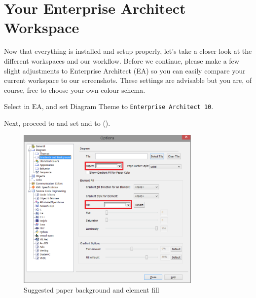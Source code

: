 \genHeader

\section{Your Enterprise Architect Workspace}

Now\hypertarget{projectStructure vis}{} that everything is installed and setup properly, let's take a closer look at the different workspaces and our workflow.
Before we continue, please make a few slight adjustments to Enterprise Architect (EA) so you can easily compare your current workspace to our screenshots.
These settings are advisable but you are, of course, free to choose your own colour schema.

\begin{stepbystep}

\item  Select  in EA, and set Diagram Theme to \texttt{Enterprise Architect 10}.

\item  Next, proceed to  and set  and  to  (). 

\begin{figure}[htbp]
    \centering
    \includegraphics[width=0.8\textwidth]{../../org.moflon.doc.handbook.01_installation/4_projectSetup/modelingWithEA/ea_images/standardPaperAndFill}
    \caption{Suggested paper background and element fill}
    \label{ea:paperAndElementFill}
\end{figure}


\end{stepbystep}
